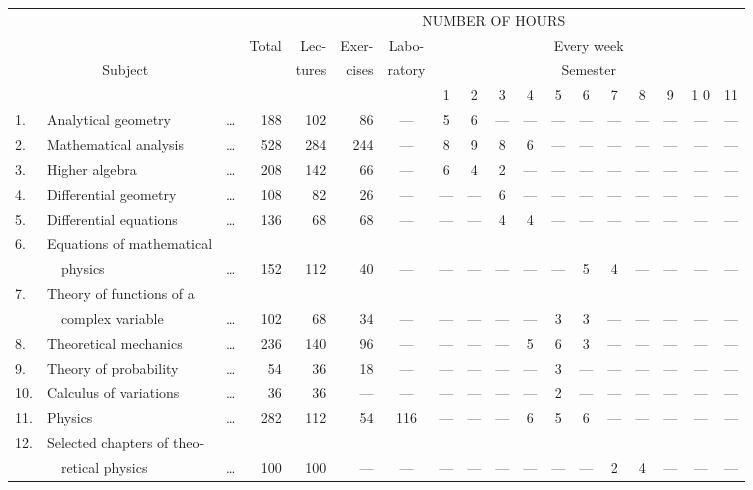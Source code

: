 \begin{landscape}
{\fontsize{9pt}{11pt}\selectfont
\tabcolsep=4pt
\renewcommand{\arraystretch}{1.7}
\begin{longtable}[l]{llc@{\,}rrrcccccccccccc}
\toprule
& &  &\multicolumn{15}{c}{NUMBER OF HOURS}\\\cline{4-18}
 & & & Total & Lec- & Exer- & Labo- & \multicolumn{11}{c}{Every week} \\[-0.3cm]
 \multicolumn{3}{c}{Subject} &  & tures & cises& ratory & \multicolumn{11}{c}{Semester}\\
& & & & & & & 1 & 2 & 3 & 4 & 5 & 6 & 7 & 8 & 9 & 1 0 & 11 \\
\midrule
1. & Analytical geometry & \ldots & 188 & 102 & 86 & --- & 5 & 6 &
---&---&---&---&---&---&---&---&---\\
2. & Mathematical analysis & \ldots & 528 & 284 & 244 & --- & 8 & 9 &
8 & 6 & ---&---&---&---&---&---&---\\
3. & Higher algebra & \ldots & 208 & 142 & 66 & --- & 6 & 4 & 2 &
---&---&---&---&---&---&---&---\\
4. & Differential geometry & \ldots & 108& 82 & 26 & ---&---&---& 6 &
---&---&---&---&---&---&---& ---\\
5. & Differential equations & \ldots & 136 & 68 & 68 & ---&---&---& 4
& 4 & ---&---&---&---&---&---&---\\ 
6. & Equations of mathematical &&&&&&&&&&&&\\[-0.3cm]
& ~~physics & \ldots & 152 & 112 & 40 & ---&---&---&---&---&---& 5 & 4 &
---&---&---&---\\
7. & Theory of functions of a &&&&&&&&& \\[-0.3cm]
& ~~complex variable & \ldots & 102 & 68 & 34& ---&---&---&---&---&
3&3&---&---&---&---&---\\
8. & Theoretical mechanics & \ldots & 236 & 140 & 96 &
---&---&---&---&5&6&3&---&---&---&---&---\\
9. & Theory of probability & \ldots & 54 &36 &18
&---&---&---&---&---&3& ---&---&---&---&---&---\\ 
10. & Calculus of variations & \ldots & 36 & 36 &
---&---&---&---&---&---& 2 & ---&---&---&---&---&---\\
11. & Physics & \ldots & 282 & 112 & 54 & 116 & ---&---&---&
6&5&6&---&---&---&---&---\\
12. & Selected chapters of theo-& &&&&&&&&\\[-0.3cm]
& ~~retical physics & \ldots & 100 & 100 &
---&---&---&---&---&---&---&---& 2 &4&---&---&---\\

\end{longtable}}
\end{landscape}
